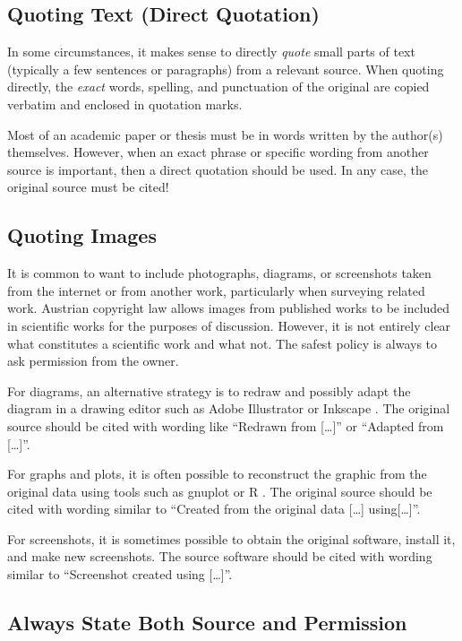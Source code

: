 \subsection{Quoting Text (Direct Quotation)}

In some circumstances, it makes sense to directly \emph{quote} small
parts of text (typically a few sentences or paragraphs) from a
relevant source. When quoting directly, the \emph{exact} words,
spelling, and punctuation of the original are copied verbatim and
enclosed in quotation marks.

Most of an academic paper or thesis must be in words written by the
author(s) themselves. However, when an exact phrase or specific
wording from another source is important, then a direct quotation
should be used. In any case, the original source must be cited!




\subsection{Quoting Images}

It is common to want to include photographs, diagrams, or screenshots
taken from the internet or from another work, particularly when
surveying related work. Austrian copyright law \citep[§ 42f]{UrhG}
allows images from published works to be included in scientific works
for the purposes of discussion. However, it is not entirely clear what
constitutes a scientific work and what not. The safest policy is
always to ask permission from the owner.

For diagrams, an alternative strategy is to redraw and possibly adapt
the diagram in a drawing editor such as Adobe Illustrator
\citep{Adobe-Illustrator} or Inkscape \citep{Inkscape}. The original
source should be cited with wording like ``Redrawn from [\ldots]'' or
``Adapted from [\ldots]''.

For graphs and plots, it is often possible to reconstruct the graphic
from the original data using tools such as gnuplot \citep{gnuplot} or
R \citep{R-Project}. The original source should be cited with wording
similar to ``Created from the original data [\ldots] using[\ldots]''.

For screenshots, it is sometimes possible to obtain the original
software, install it, and make new screenshots. The source software
should be cited with wording similar to ``Screenshot created using
[\ldots]''.




\subsection{Always State Both Source and Permission}

